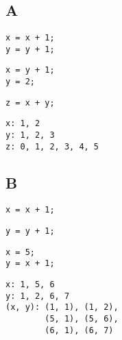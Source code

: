 \section{}
\subsection{A}
\begin{minipage}[t]{.33\textwidth}
    \begin{lstlisting}[caption=Thread 1]
x = x + 1;
y = y + 1;
    \end{lstlisting}
\end{minipage}
\begin{minipage}[t]{.33\textwidth}
    \begin{lstlisting}[caption=Thread 2]
x = y + 1;
y = 2;
    \end{lstlisting}
\end{minipage}
\begin{minipage}[t]{.33\textwidth}
    \begin{lstlisting}[caption=Thread 3]
z = x + y;
    \end{lstlisting}
\end{minipage}

\begin{lstlisting}
x: 1, 2
y: 1, 2, 3
z: 0, 1, 2, 3, 4, 5
\end{lstlisting}

\subsection{B}
\begin{minipage}[t]{.33\textwidth}
    \begin{lstlisting}[caption=Thread 1]
x = x + 1;
    \end{lstlisting}
\end{minipage}
\begin{minipage}[t]{.33\textwidth}
    \begin{lstlisting}[caption=Thread 2]
y = y + 1;
    \end{lstlisting}
\end{minipage}
\begin{minipage}[t]{.33\textwidth}
    \begin{lstlisting}[caption=Thread 3]
x = 5;
y = x + 1;
    \end{lstlisting}
\end{minipage}

\begin{lstlisting}
x: 1, 5, 6
y: 1, 2, 6, 7
(x, y): (1, 1), (1, 2),
        (5, 1), (5, 6),
        (6, 1), (6, 7)
\end{lstlisting}